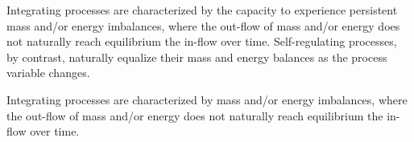 \vskip 10pt

Integrating processes are characterized by the capacity to experience persistent mass and/or energy imbalances, where the out-flow of mass and/or energy does not naturally reach equilibrium the in-flow over time.  Self-regulating processes, by contrast, naturally equalize their mass and energy balances as the process variable changes.







Integrating processes are characterized by mass and/or energy imbalances, where the out-flow of mass and/or energy does not naturally reach equilibrium the in-flow over time.




